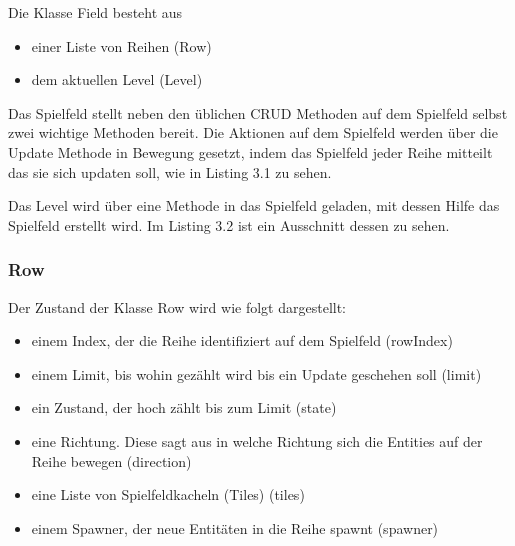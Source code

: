 \documentclass[a4paper,10pt]{report}
\begin{document}
{{{				Die Klasse Field besteht aus 
				\begin{itemize}
					\item einer Liste von Reihen (Row)
					\item dem aktuellen Level (Level)
				\end{itemize}	
											
				\noindent
				Das Spielfeld stellt neben den üblichen CRUD Methoden auf dem Spielfeld selbst zwei wichtige Methoden bereit.
				\newline \newline
				Die Aktionen auf dem Spielfeld werden über die Update Methode in Bewegung gesetzt, indem das Spielfeld jeder Reihe mitteilt das sie sich updaten soll, wie in Listing 3.1 zu sehen.
				
					
							
				\newpage  \noindent 
				Das Level wird über eine Methode in das Spielfeld geladen, mit dessen Hilfe das Spielfeld erstellt wird.
				Im Listing 3.2 ist ein Ausschnitt dessen zu sehen.
				\newline 
				
									
			}
				
			\subsubsection{Row}
			{
				\label{sssec:rowclass}
				Der Zustand der Klasse Row wird wie folgt dargestellt:
				
				\begin{itemize}
					\item einem Index, der die Reihe identifiziert auf dem Spielfeld (rowIndex)
					\item einem Limit, bis wohin gezählt wird bis ein Update geschehen soll (limit)
					\item ein Zustand, der hoch zählt bis zum Limit (state)
					\item eine Richtung. Diese sagt aus in welche Richtung sich die Entities auf der Reihe bewegen (direction)
					\item eine Liste von Spielfeldkacheln (Tiles) (tiles)
					\item einem Spawner, der neue Entitäten in die Reihe spawnt (spawner)  
				\end{itemize}
				
}}}
\end{document}

